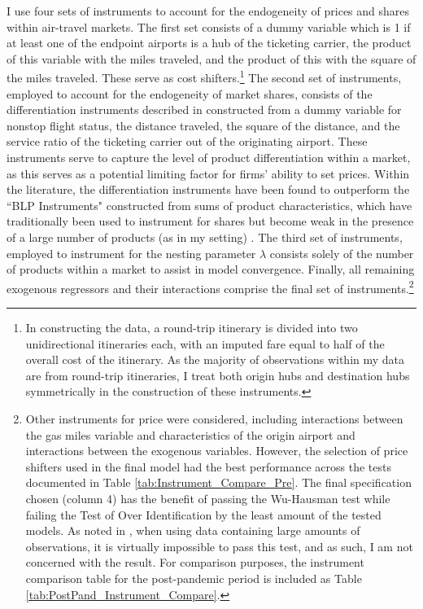 \documentclass{article}
\begin{document}
	I use four sets of instruments to account for the endogeneity of prices and shares within air-travel markets. The first set consists of a dummy variable which is 1 if at least one of the endpoint airports is a hub of the ticketing carrier, the product of this variable with the miles traveled, and the product of this with the square of the miles traveled. These serve as cost shifters.\footnote{In constructing the data, a round-trip itinerary is divided into two unidirectional itineraries each, with an imputed fare equal to half of the overall cost of the itinerary. As the majority of observations within my data are from round-trip itineraries, I treat both origin hubs and destination hubs symmetrically in the construction of these instruments.} The second set of instruments, employed to account for the endogeneity of market shares, consists of the differentiation instruments described in \citet{gandhi_measuring_2019} constructed from a dummy variable for nonstop flight status, the distance traveled, the square of the distance, and the service ratio of the ticketing carrier out of the originating airport. These instruments serve to capture the level of product differentiation within a market, as this serves as a potential limiting factor for firms' ability to set prices. Within the literature, the differentiation instruments have been found to outperform the ``BLP Instruments" constructed from sums of product characteristics, which have traditionally been used to instrument for shares but become weak in the presence of a large number of products (as in my setting) \citep{conlon_best_2020}.  The third set of instruments, employed to instrument for the nesting parameter $\lambda$ consists solely of the number of products within a market to assist in model convergence. Finally, all remaining exogenous regressors and their interactions comprise the final set of instruments.\footnote{Other instruments for price were considered, including interactions between the gas miles variable and characteristics of the origin airport and interactions between the exogenous variables. However, the selection of price shifters used in the final model had the best performance across the tests documented in Table \ref{tab:Instrument_Compare_Pre}. The final specification chosen (column 4) has the benefit of passing the Wu-Hausman test while failing the Test of Over Identification by the least amount of the tested models. As noted in \citet{nevo_measuring_2001}, when using data containing large amounts of observations, it is virtually impossible to pass this test, and as such, I am not concerned with the result. For comparison purposes, the instrument comparison table for the post-pandemic period is included as Table \ref{tab:PostPand_Instrument_Compare}.}
	
\end{document}
